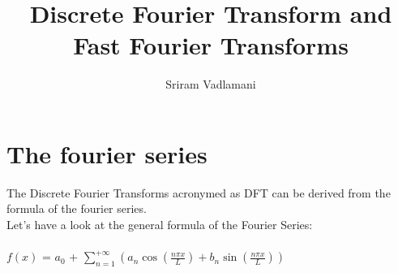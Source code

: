 \documentclass{article}
\author{}
\date{}
\title{Discrete Fourier Transform and Fast Fourier Transforms}
\author{Sriram Vadlamani}
\begin{document}
\maketitle
\newpage
\section{The fourier series}
The Discrete Fourier Transforms acronymed as DFT can be derived from the formula of the fourier series.\\
Let's have a look at the general formula of the Fourier Series:\\
\\
$f(x)$ = $a_{0}$ + $\displaystyle \sum_{n = 1}^{+ \infty}(a_{n}\cos(\frac{n \pi x} {L}) + b_{n}\sin(\frac{n \pi x}{L}))$\\
\\
\end{document}
